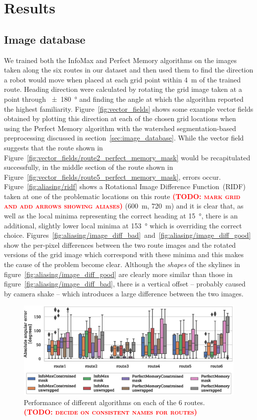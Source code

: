 \documentclass[letterpaper]{article}
\newcommand{\todo}[1]{\textbf{\textsc{\textcolor{red}{(TODO: #1)}}}}
\begin{document}
\section{Results}
\subsection{Image database}
We trained both the InfoMax and Perfect Memory algorithms on the images taken along the six routes in our dataset and then used them to find the direction a robot would move when placed at each grid point within \SI{4}{\metre} of the trained route. 
Heading direction were calculated by rotating the grid image taken at a point through \SI{\pm 180}{\degree} and finding the angle at which the algorithm reported the highest familiarity.
Figure~\ref{fig:vector_fields} shows some example vector fields obtained by plotting this direction at each of the chosen grid locations when using the Perfect Memory algorithm with the watershed segmentation-based preprocessing discussed in section~\ref{sec:image_database}. 
While the vector field suggests that the route shown in Figure~\ref{fig:vector_fields/route2_perfect_memory_mask} would be recapitulated successfully, in the middle section of the route shown in Figure~\ref{fig:vector_fields/route5_perfect_memory_mask}, errors occur.
Figure~\ref{fig:aliasing/ridf} shows a Rotational Image Difference Function~(RIDF) taken at one of the problematic locations on this route \todo{mark grid and add arrows showing aliases} (\SI{600}{\metre}, \SI{720}{\metre}) and it is clear that, as well as the local minima representing the correct heading at \SI{15}{\degree}, there is an additional, slightly lower local minima at \SI{153}{\degree} which is overriding the correct choice.
Figures~\ref{fig:aliasing/image_diff_bad}~and~\ref{fig:aliasing/image_diff_good} show the per-pixel differences between the two route images and the rotated versions of the grid image which correspond with these minima and this makes the cause of the problem become clear.
Although the \emph{shapes} of the skylines in figure~\ref{fig:aliasing/image_diff_good} are clearly more similar than those in figure~\ref{fig:aliasing/image_diff_bad}, there is a vertical offset -- probably caused by camera shake -- which introduces a large difference between the two images.

\begin{figure}[t]
    \centering
    \includegraphics{figures/route_benchmark.eps}
    \caption{Performance of different algorithms on each of the 6 routes. \todo{decide on consistent names for routes}}
    \label{fig:route_benchmark}
\end{figure}
\end{document}
